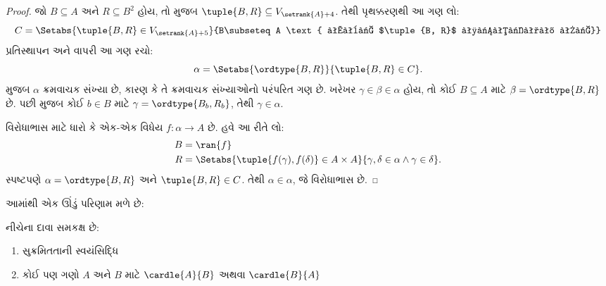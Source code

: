 \begin{proof}
જો $B \subseteq A$ અને $R \subseteq B^2$ હોય,
તો 
મુજબ $\tuple{B, R} \subseteq
V_{\setrank{A}+4}$. તેથી પૃથક્કરણથી આ ગણ લો:
\[
	C = \Setabs{\tuple{B, R} \in V_{\setrank{A}+5}}{B\subseteq A 
	\text{ અને $\tuple{B, R}$ સુક્રમ છે}}
\]
પ્રતિસ્થાપન અને
વાપરી આ ગણ રચો:
\[
	\alpha = \Setabs{\ordtype{B, R}}{\tuple{B, R} \in C}.
\]
 મુજબ
$\alpha$ ક્રમવાચક સંખ્યા છે, કારણ કે તે
ક્રમવાચક સંખ્યાઓનો પરંપરિત ગણ છે.
ખરેખર $\gamma \in \beta \in \alpha$ હોય,
તો કોઈ $B \subseteq A$ માટે
$\beta = \ordtype{B, R}$ છે. પછી
મુજબ કોઈ $b \in B$ માટે
$\gamma = \ordtype{B_b, R_b}$, તેથી
$\gamma \in \alpha$.

વિરોધાભાસ માટે ધારો કે એક-એક વિધેય
$f \colon \alpha \to A$ છે. હવે આ રીતે લો:
\begin{align*}
	B &= \ran{f}\\
	R &= \Setabs{\tuple{f(\gamma), f(\delta)} \in A \times A}{\gamma,\delta\in\alpha \land \gamma \in \delta}.
\end{align*}
સ્પષ્ટપણે $\alpha = \ordtype{B, R}$ અને
$\tuple{B, R} \in C$. તેથી $\alpha
\in \alpha$, જે વિરોધાભાસ છે.
\end{proof}

આમાંથી એક ઊંડું પરિણામ મળે છે:

\begin{thm}[\emph{$\ZF$માં}]
નીચેના દાવા સમકક્ષ છે:
\begin{enumerate}
	\item{} સુક્રમિતતાની સ્વયંસિદ્ધિ
	\item{} કોઈ પણ ગણો $A$ અને $B$ માટે
	$\cardle{A}{B}$ અથવા $\cardle{B}{A}$
\end{enumerate}
\end{thm}

